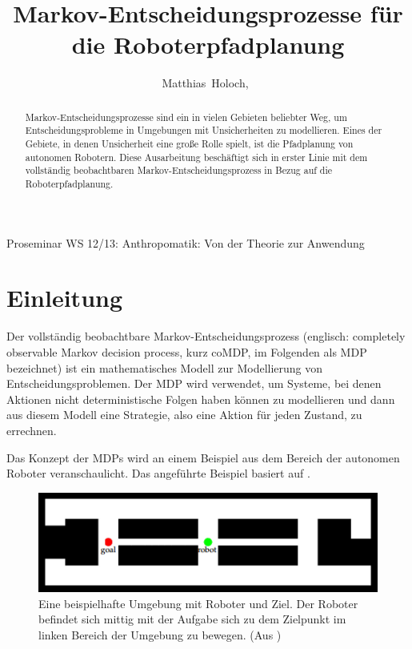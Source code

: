 \documentclass[a4paper]{IEEEtran}
\begin{document}
\title{Markov-Entscheidungsprozesse für die Roboterpfadplanung}

\author{Matthias~Holoch,~}%




%
{Proseminar WS 12/13: Anthropomatik: Von der Theorie zur Anwendung}



\maketitle


\begin{abstract}
Markov-Entscheidungsprozesse sind ein in vielen Gebieten beliebter Weg, um Entscheidungsprobleme in Umgebungen mit Unsicherheiten zu modellieren. Eines der Gebiete, in denen Unsicherheit eine große Rolle spielt, ist die Pfadplanung von autonomen Robotern. Diese Ausarbeitung beschäftigt sich in erster Linie mit dem vollständig beobachtbaren Markov-Entscheidungsprozess in Bezug auf die Roboterpfadplanung.
\end{abstract}


\section{Einleitung}
Der vollständig beobachtbare Markov-Entscheidungsprozess (englisch: completely observable Markov decision process, kurz coMDP, im Folgenden als MDP bezeichnet) ist ein mathematisches Modell zur Modellierung von Entscheidungsproblemen. Der MDP wird verwendet, um Systeme, bei denen Aktionen nicht deterministische Folgen haben können zu modellieren und dann aus diesem Modell eine Strategie, also eine Aktion für jeden Zustand, zu errechnen.

Das Konzept der MDPs wird an einem Beispiel aus dem Bereich der autonomen Roboter veranschaulicht. Das angeführte Beispiel basiert auf \cite{thrun2005probabilistic}.

\begin{figure}[ht]
	\centering
	\includegraphics[scale=0.72]{images/autnmRobot_basicSituation.png}
	\caption{Eine beispielhafte Umgebung mit Roboter und Ziel. Der Roboter befindet sich mittig mit der Aufgabe sich zu dem Zielpunkt im linken Bereich der Umgebung zu bewegen. (Aus \cite{thrun2005probabilistic})}
	\label{fig:autnmRob_bSit}
\end{figure}
\end{document}
